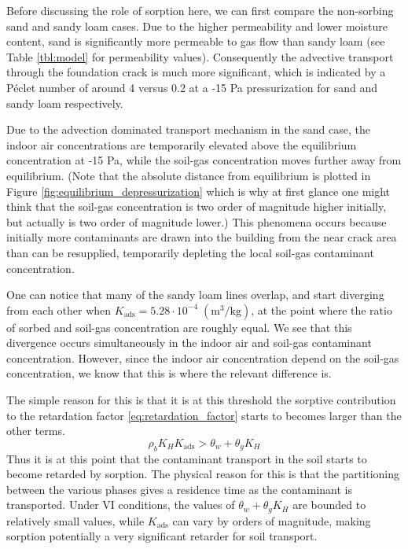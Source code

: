 Before discussing the role of sorption here, we can first compare the non-sorbing sand and sandy loam cases.
Due to the higher permeability and lower moisture content, sand is significantly more permeable to gas flow than sandy loam (see Table \ref{tbl:model} for permeability values).
Consequently the advective transport through the foundation crack is much more significant, which is indicated by a Péclet number of around 4 versus 0.2 at a -15 Pa pressurization for sand and sandy loam respectively.\par

Due to the advection dominated transport mechanism in the sand case, the indoor air concentrations are temporarily elevated above the equilibrium concentration at -15 Pa, while the soil-gas concentration moves further away from equilibrium.
(Note that the absolute distance from equilibrium is plotted in Figure \ref{fig:equilibrium_depressurization} which is why at first glance one might think that the soil-gas concentration is two order of magnitude higher initially, but actually is two order of magnitude lower.)
This phenomena occurs because initially more contaminants are drawn into the building from the near crack area than can be resupplied, temporarily depleting the local soil-gas contaminant concentration.\par

One can notice that many of the sandy loam lines overlap, and start diverging from each other when $K_\mathrm{ads} = 5.28 \cdot 10^{-4} \; \mathrm{(m^3/kg)}$, at the point where the ratio of sorbed and soil-gas concentration are roughly equal.
We see that this divergence occurs simultaneously in the indoor air and soil-gas contaminant concentration.
However, since the indoor air concentration depend on the soil-gas concentration, we know that this is where the relevant difference is.\par

The simple reason for this is that it is at this threshold the sorptive contribution to the retardation factor \eqref{eq:retardation_factor} starts to becomes larger than the other terms.
\begin{equation}
   \rho_b K_H K_\mathrm{ads} > \theta_w + \theta_g K_H
\end{equation}
Thus it is at this point that the contaminant transport in the soil starts to become retarded by sorption.
The physical reason for this is that the partitioning between the various phases gives a residence time as the contaminant is transported.
Under VI conditions, the values of $\theta_w + \theta_g K_H$ are bounded to relatively small values, while $K_\mathrm{ads}$ can vary by orders of magnitude, making sorption potentially a very significant retarder for soil transport.\par

